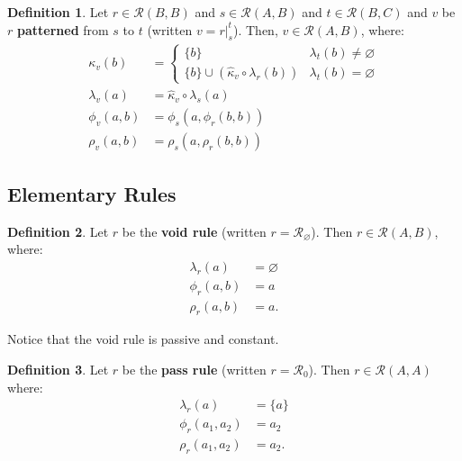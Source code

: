 \documentclass{article}
\theoremstyle{definition}
\newtheorem{definition}{Definition}[subsection]
\theoremstyle{plain}
\def\rule{\mathcal{R}}
\begin{document}
\begin{definition}
  Let $ r \in \rule (B, B) $
  and $ s \in \rule (A, B) $
  and $ t \in \rule (B, C) $
  and $ v $ be $ r $ \textbf{patterned} from $ s $ to $ t $
  (written $ v = r \rvert_{s}^{t} $).
  Then, $ v \in \rule (A, B) $, where:
  \begin{align}
      \kappa_v (b) & = \begin{cases}
                         \{ b \}                                               & \lambda_t (b) \neq \varnothing \\
                         \{ b \} \cup (\widehat{\kappa}_v \circ \lambda_r (b)) & \lambda_t (b) =    \varnothing
                       \end{cases} \\
  \lambda_v (a)    & = \widehat{\kappa}_v \circ \lambda_s (a) \\
     \phi_v (a, b) & = \phi_s (a, \phi_r (b, b)) \\
     \rho_v (a, b) & = \rho_s (a, \rho_r (b, b)) 
  \end{align}
\end{definition}

\subsection{Elementary Rules} %

\begin{definition}
  Let $ r $ be the \textbf{void rule}
  (written $ r = \rule_\varnothing $).
  Then $ r \in \rule (A, B) $, where:
  \begin{align}
    \lambda_r (a)    & = \varnothing \\
       \phi_r (a, b) & = a \\
       \rho_r (a, b) & = a.
  \end{align}
\end{definition}

Notice that the void rule is passive and constant.

\begin{definition}
  Let $ r $ be the \textbf{pass rule}
  (written $ r = \rule_0 $).
  Then $ r \in \rule (A, A) $ where:
  \begin{align}
    \lambda_r (a)        & = \{ a \} \\
       \phi_r (a_1, a_2) & =  a_2 \\
       \rho_r (a_1, a_2) & =  a_2.
  \end{align}
\end{definition}
\end{document}
